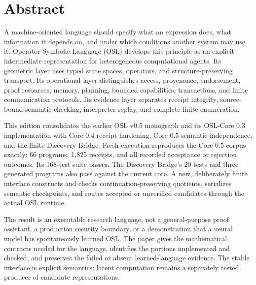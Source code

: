 \documentclass[11pt]{article}
\begin{document}
\section*{Abstract}
A machine-oriented language should specify what an expression does, what information it depends on, and under which conditions another system may use it. Operator-Symbolic Language (OSL) develops this principle as an explicit intermediate representation for heterogeneous computational agents. Its geometric layer uses typed state spaces, operators, and structure-preserving transport. Its operational layer distinguishes access, provenance, endorsement, proof resources, memory, planning, bounded capabilities, transactions, and finite communication protocols. Its evidence layer separates receipt integrity, source-bound semantic checking, interpreter replay, and complete finite enumeration.

This edition consolidates the earlier OSL v0.5 monograph and its OSL-Core 0.3 implementation with Core 0.4 receipt hardening, Core 0.5 semantic independence, and the finite Discovery Bridge. Fresh execution reproduces the Core 0.5 corpus exactly: 66 programs, 1,825 receipts, and all recorded acceptance or rejection outcomes. Its 168-test suite passes. The Discovery Bridge's 20 tests and three generated programs also pass against the current core. A new, deliberately finite interface constructs and checks continuation-preserving quotients, serializes semantic checkpoints, and routes accepted or unverified candidates through the actual OSL runtime.

The result is an executable research language, not a general-purpose proof assistant, a production security boundary, or a demonstration that a neural model has spontaneously learned OSL. The paper gives the mathematical contracts needed for the language, identifies the portions implemented and checked, and preserves the failed or absent learned-language evidence. The stable interface is explicit semantics; latent computation remains a separately tested producer of candidate representations.
\end{document}
